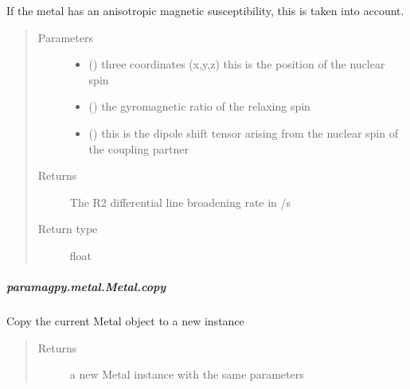 \documentclass[a4paper,10pt,english]{sphinxmanual}
\begin{document}
\begin{fulllineitems}
\begin{fulllineitems}
\begin{fulllineitems}
If the metal has an anisotropic magnetic susceptibility, this is
taken into account.
\begin{quote}\begin{description}
\item[{Parameters}] \leavevmode\begin{itemize}
\item {} 
 () \textendash{} three coordinates (x,y,z)
this is the position of the nuclear spin

\item {} 
 () \textendash{} the gyromagnetic ratio of the relaxing spin

\item {} 
 () \textendash{} this is the dipole shift tensor arising from
the nuclear spin of the coupling partner

\end{itemize}

\item[{Returns}] \leavevmode
{} \textendash{} The R2 differential line broadening rate in /s

\item[{Return type}] \leavevmode
float

\end{description}\end{quote}

\end{fulllineitems}



\subparagraph{paramagpy.metal.Metal.copy}
\label{\detokenize{reference/generated/paramagpy.metal.Metal.copy:paramagpy-metal-metal-copy}}\label{\detokenize{reference/generated/paramagpy.metal.Metal.copy::doc}}

\begin{fulllineitems}
\label{\detokenize{reference/generated/paramagpy.metal.Metal.copy:paramagpy.metal.Metal.copy}}
Copy the current Metal object to a new instance
\begin{quote}\begin{description}
\item[{Returns}] \leavevmode
{} \textendash{} a new Metal instance with the same parameters


\end{description}
\end{quote}
\end{fulllineitems}
\end{fulllineitems}
\end{fulllineitems}
\end{document}
